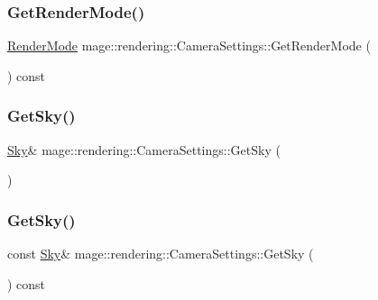 \subsubsection{\texorpdfstring{Get\+Render\+Mode()}{GetRenderMode()}}
{\footnotesize\ttfamily \mbox{\hyperlink{namespacemage_1_1rendering_aeb14ce7610cc9391f4e01be027b91dcc}{Render\+Mode}} mage\+::rendering\+::\+Camera\+Settings\+::\+Get\+Render\+Mode (\begin{DoxyParamCaption}{ }\end{DoxyParamCaption}) const\hspace{0.3cm}{\ttfamily [noexcept]}}

\mbox{\label{classmage_1_1rendering_1_1_camera_settings_a3538572fc79fa03380cb9ed8cceeba42}} 
\subsubsection{\texorpdfstring{Get\+Sky()}{GetSky()}\hspace{0.1cm}{\footnotesize\ttfamily [1/2]}}
{\footnotesize\ttfamily \mbox{\hyperlink{classmage_1_1rendering_1_1_sky}{Sky}}\& mage\+::rendering\+::\+Camera\+Settings\+::\+Get\+Sky (\begin{DoxyParamCaption}{ }\end{DoxyParamCaption})\hspace{0.3cm}{\ttfamily [noexcept]}}

\mbox{\label{classmage_1_1rendering_1_1_camera_settings_a0045fb85eafcb33dff43c04656c4cc3b}} 
\subsubsection{\texorpdfstring{Get\+Sky()}{GetSky()}\hspace{0.1cm}{\footnotesize\ttfamily [2/2]}}
{\footnotesize\ttfamily const \mbox{\hyperlink{classmage_1_1rendering_1_1_sky}{Sky}}\& mage\+::rendering\+::\+Camera\+Settings\+::\+Get\+Sky (\begin{DoxyParamCaption}{ }\end{DoxyParamCaption}) const\hspace{0.3cm}{\ttfamily [noexcept]}}

